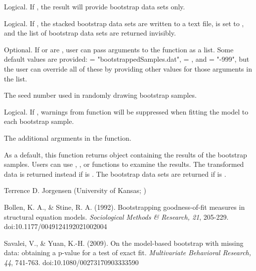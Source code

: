 \documentclass[a4paper]{book}
\begin{document}
\begin{Arguments}
\begin{ldescription}
\item[\code{bootSamplesOnly}] 
Logical. If , the result will provide bootstrap data sets only.

\item[\code{writeBootData}] 
Logical. If , the stacked bootstrap data sets are written to a text file,  is set to , and the list of bootstrap data sets are returned invisibly.

\item[\code{writeArgs}] 
Optional. If  or  are , user can pass arguments to the  function as a list.  Some default values are provided:  = "bootstrappedSamples.dat",  = , and  = "-999", but the user can override all of these by providing other values for those arguments in the  list.

\item[\code{seed}] 
The seed number used in randomly drawing bootstrap samples.

\item[\code{suppressWarn}] 
Logical. If , warnings from  function will be suppressed when fitting the model to each bootstrap sample.

\item[\code{...}] 
The additional arguments in the  function.

\end{ldescription}
\end{Arguments}
%
\begin{Value}
As a default, this function returns  object containing the results of the bootstrap samples. Users can use , , or  functions to examine the results. The transformed data is returned instead if  is . The bootstrap data sets are returned if  is .
\end{Value}
%
\begin{Author}\relax
Terrence D. Jorgensen (University of Kansas; )
\end{Author}
%
\begin{References}\relax

Bollen, K. A., \bsl{}\& Stine, R. A. (1992). Bootstrapping goodness-of-fit measures in structural equation models. \emph{Sociological Methods \bsl{}\& Research, 21}, 205-229. doi:10.1177/0049124192021002004 

Savalei, V., \bsl{}\& Yuan, K.-H. (2009). On the model-based bootstrap with missing data: obtaining a p-value for a test of exact fit. \emph{Multivariate Behavioral Research, 44}, 741-763. doi:10.1080/00273170903333590
\end{References}
\end{document}
